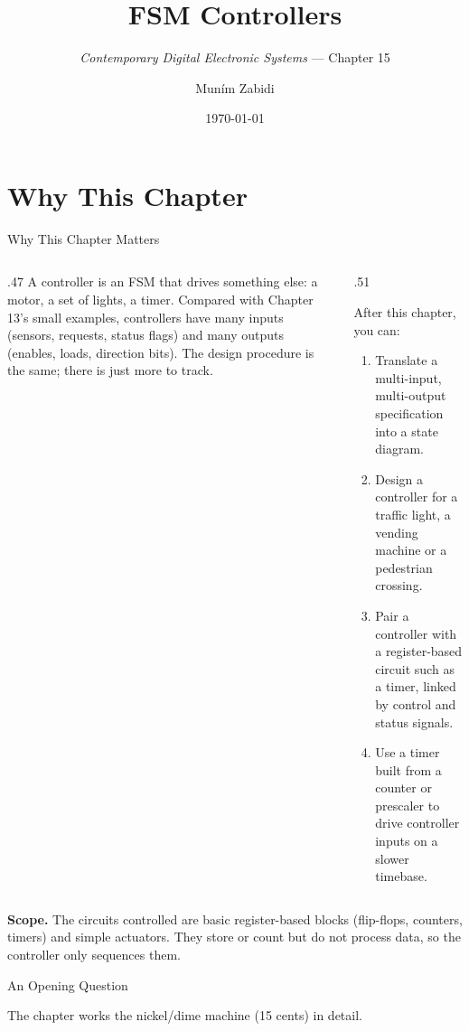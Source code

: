 \documentclass[9pt,aspectratio=169,xcolor=table]{beamer}
\title{FSM Controllers}
\subtitle{\emph{Contemporary Digital Electronic Systems} --- Chapter 15}
\author{Mun\'{i}m Zabidi}
\institute{\color{primary}Faculty of Electrical Engineering, Universiti Teknologi Malaysia}
\date{\today}
\begin{document}
\titlepage

\section{Why This Chapter}

\begin{frame}{Why This Chapter Matters}
  \begin{columns}[c]
  \begin{column}{.47\textwidth}
    A \alert{controller} is an FSM that drives something else: a motor, a set of lights, a timer. Compared with Chapter 13's small examples, controllers have many inputs (sensors, requests, status flags) and many outputs (enables, loads, direction bits). The design procedure is the same; there is just more to track.
  \end{column}
  \begin{column}{.51\textwidth}
    \begin{block}{After this chapter, you can:}
    {\small
    \begin{enumerate}\itemsep2pt
      \item Translate a multi-input, multi-output specification into a state diagram.
      \item Design a controller for a traffic light, a vending machine or a pedestrian crossing.
      \item Pair a controller with a register-based circuit such as a timer, linked by control and status signals.
      \item Use a timer built from a counter or prescaler to drive controller inputs on a slower timebase.
    \end{enumerate}}
    \end{block}
  \end{column}
  \end{columns}
  \vspace{1mm}
  {\footnotesize \textbf{Scope.} The circuits controlled are basic register-based blocks (flip-flops, counters, timers) and simple actuators. They store or count but do not process data, so the controller only sequences them.}
\end{frame}

\begin{frame}{An Opening Question}
  \leavevmode\vspace{4mm}
  \begin{center}
  \end{center}
  \vspace{4mm}
  The chapter works the nickel/dime machine (15 cents) in detail.
\end{frame}
\end{document}
